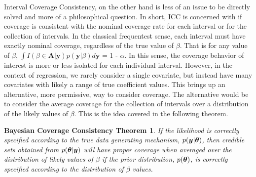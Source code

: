 Interval Coverage Consistency, on the other hand is less of an issue to be directly solved and more of a philosophical question. In short, ICC is concerned with if coverage is consistent with the nominal coverage rate for each interval or for the collection of intervals. In the classical frequentest sense, each interval must have exactly nominal coverage, regardless of the true value of $\beta$. That is for any value of $\beta$, $\int I(\beta \in \boldsymbol{A} | \boldsymbol{y}) p(\boldsymbol{y} | \beta)d\boldsymbol{y}$ = 1 - $\alpha$. In this sense, the coverage behavior of interest is more or less isolated for each individual interval. However, in the context of regression, we rarely consider a single covariate, but instead have many covariates with likely a range of true coefficient values. This brings up an alternative, more permissive, way to consider coverage. The alternative would be to consider the average coverage for the collection of intervals over a distribution of the likely values of $\beta$. This is the idea covered in the following theorem.

\newtheorem*{coverage}{Bayesian Coverage Consistency Theorem\label{Thm:BCC}}

\begin{coverage}
If the likelihood is correctly specified according to the true data generating mechanism, $p(\boldsymbol{y} | \boldsymbol{\theta})$, then credible sets obtained from $p(\boldsymbol{\theta}|\boldsymbol{y})$ will have proper coverage when averaged over the distribution of likely values of $\beta$ if the prior distribution, $p(\boldsymbol{\theta})$, is correctly specified according to the distribution of $\beta$ values.
\end{coverage}

